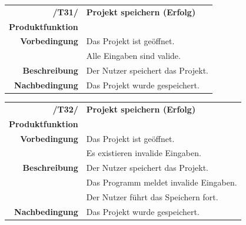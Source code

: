 \documentclass{article}
\begin{document}
\begin{table}[H]
\begin{tabularx}{\textwidth}{rX}
 \vspace{1mm}
\textbf{/T31/}         & \textbf{Projekt speichern (Erfolg)} \\ \vspace{1mm}
\textbf{Produktfunktion} & \nameref{sec:f:Projekt speichern} \\
\textbf{Vorbedingung}  & Das Projekt ist geöffnet.   \\ \vspace{1mm} & Alle Eingaben sind valide. \\ \vspace{1mm}
\textbf{Beschreibung}  & Der Nutzer speichert das Projekt. \\
\textbf{Nachbedingung} & Das Projekt wurde gespeichert.
\end{tabularx}
\end{table}

\begin{table}[H]
\begin{tabularx}{\textwidth}{rX}
 \vspace{1mm}
\textbf{/T32/}         & \textbf{Projekt speichern (Erfolg)} \\ \vspace{1mm}
\textbf{Produktfunktion} & \nameref{sec:f:Projekt speichern} \\
\textbf{Vorbedingung}  & Das Projekt ist geöffnet.   \\ \vspace{1mm} & Es existieren invalide Eingaben. \\
\textbf{Beschreibung}  & Der Nutzer speichert das Projekt. \\ & Das Programm meldet invalide Eingaben. \\ \vspace{1mm} & Der Nutzer führt das Speichern fort. \\
\textbf{Nachbedingung} & Das Projekt wurde gespeichert.
\end{tabularx}
\end{table}
\end{document}
